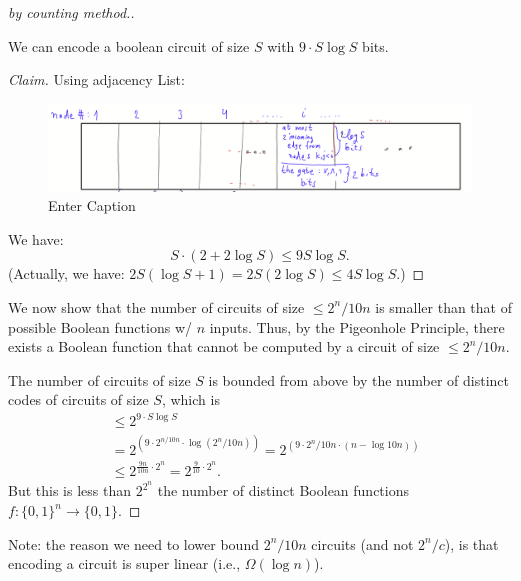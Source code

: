 \begin{proof}[by counting method.]
\mbox{}\\

\begin{claim}
We can encode a boolean circuit of size $S$ with $9\cdot S \log S$ bits.
\end{claim}

\begin{proof}[Claim]
Using adjacency List:
\begin{figure}[H]
    \centering
    \includegraphics[width=1.1\linewidth]{images/shannon table.png}
    \caption{Enter Caption}
    \label{fig:enter-label}
\end{figure}




We have:
$$
S \cdot(2+2 \log S) \leq 9 S \log S
.$$
(Actually, we have: 
$ 2S(\log S+1) = 2S(2 \log S) \leq 4 S \log S.
$)
\end{proof}

We now show that the number of circuits of size $\leq 2^n / 10 n$ is smaller than that of possible Boolean functions w/ $n$ inputs.
Thus, by the Pigeonhole Principle, there exists a Boolean function that cannot be computed by a circuit of size $\leq 2^n / 10 n$.

The number of circuits of size $S$ is bounded from above by the number of distinct codes of circuits of size $S$, which is
$$
\begin{aligned}
& \leq 2^{9 \cdot S \log S} \\
& =2^{\left(9 \cdot 2^{n / 10 n} \cdot \log \left(2^n / 10 n\right)\right)}=2^{\left(9 \cdot 2^n / 10 n \cdot(n-\log 10 n)\right)} \\
& \leq 2^{\frac{9 n}{10 n} \cdot 2^n}=2^{\frac{9}{10} \cdot 2^n} . 
\end{aligned}
$$
But this is 
less than $2^{2^n}$ the number of distinct Boolean functions $f:\{0,1\}^n\to\{0,1\}$. 
\end{proof}




Note: the reason we need to lower bound $2^n/10n$ circuits (and not $2^n/c$), is that encoding a circuit is super linear (i.e., $\Omega (\log n)$).



